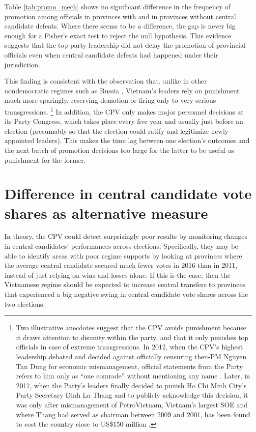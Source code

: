 \documentclass[12pt]{article}
\newcommand\fnote[1]{\footnote{\baselineskip=2\normalbaselineskip#1}}
\newcommand{\1}{\mathbbm{1}}
\begin{document}


Table \ref{tab:promo_mech} shows no significant difference in the frequency of promotion among officials in provinces with and in provinces without central candidate defeats. Where there seems to be a difference, the gap is never big enough for a Fisher's exact test to reject the null hypothesis. This evidence suggests that the top party leadership did not delay the promotion of provincial officials even when central candidate defeats had happened under their jurisdiction.

This finding is consistent with the observation that, unlike in other nondemocratic regimes such as Russia \citep{Myagkov2009}, Vietnam's leaders rely on punishment much more sparingly, reserving demotion or firing only to very serious transgressions. \fnote{Two illustrative anecdotes suggest that the CPV avoids punishment because it draws attention to disunity within the party, and that it only punishes top officials in case of extreme transgressions. In 2012, when the CPV's highest leadership debated and decided against officially censuring then-PM Nguyen Tan Dung for economic mismanagement, official statements from the Party refers to him only as ``one comrade'' without mentioning any name \citep{voa2012}. Later, in 2017, when the Party's leaders finally decided to punish Ho Chi Minh City's Party Secretary Dinh La Thang and to publicly acknowledge this decision, it was only after mismanagement of PetroVietnam, Vietnam's largest SOE and where Thang had served as chairman between 2009 and 2001, has been found to cost the country close to US\$150 million \citep{BBC2017}.} 
In addition, the CPV only makes major personnel decisions at its Party Congress, which takes place every five year and usually just before an election (presumably so that the election could ratify and legitimize newly appointed leaders). This makes the time lag between one election's outcomes and the next batch of promotion decisions too large for the latter to be useful as punishment for the former.

\section{Difference in central candidate vote shares as alternative measure}
\label{app:share_dif}

In theory, the CPV could detect surprisingly poor results by monitoring changes in central candidates' performances across elections. Specifically, they may be able to identify areas with poor regime supports by looking at provinces where the average central candidate secured much fewer votes in 2016 than in 2011, instead of just relying on wins and losses alone. If this is the case, then the Vietnamese regime should be expected to increase central transfers to provinces that experienced a big negative swing in central candidate vote shares across the two elections.
\end{document}
